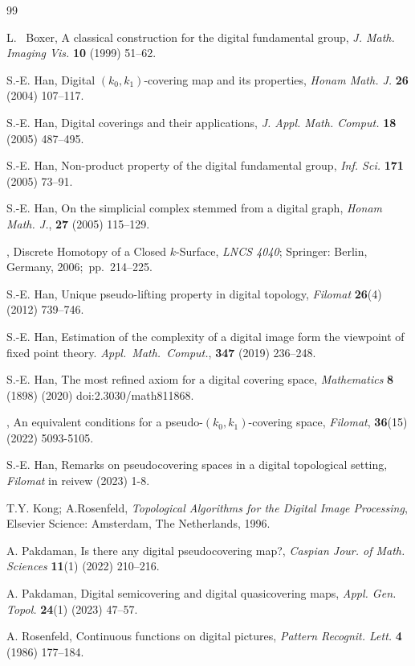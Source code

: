 \documentclass[J,12pt]{amsart}
\begin{document}
\begin{thebibliography}{99}	
		
	 {L.~ Boxer}, {A classical construction for the digital fundamental group},
	{\em J. Math. Imaging Vis.} {\bf 10} (1999) 51--62.
		
	 {S.-E. Han}, {Digital $(k_0, k_1)$-covering map and its properties},
	{\em Honam Math. J.} {\bf 26} (2004) 107--117.
	
	 {S.-E. Han}, {Digital coverings and their applications}, {\em  J. Appl. Math. Comput.} {\bf 18} (2005) 487--495.
	
	 {S.-E. Han}, {Non-product property of the digital fundamental group}, {\em Inf. Sci.} {\bf 171} (2005) 73--91.
	
	 {S.-E. Han}, {On the simplicial complex stemmed from a digital graph},
	{\em Honam Math. J.}, {\bf 27} (2005) 115--129.
	
	, {Discrete Homotopy of a Closed $k$-Surface}, {\em LNCS 4040};
	Springer: Berlin, Germany, 2006;~pp.~214--225.
	
	 {S.-E. Han}, {Unique pseudo-lifting property in digital topology}, {\em Filomat} {\bf 26}(4) (2012) 739--746.
	
	 {S.-E. Han}, {Estimation of the complexity of a digital image form the viewpoint of fixed point theory}.
	{\em Appl.~Math.~Comput.}, {\bf 347} (2019) 236--248.
	
	 {S.-E. Han}, {The most refined axiom for a digital covering space}, {\em Mathematics} {\bf 8} (1898) (2020) doi:2.3030/math811868.	
	
	
	, {An equivalent conditions for a pseudo-$(k_0,k_1)$-covering space}, {\em Filomat}, {\bf 36}(15) (2022) 5093-5105.
	
		 {S.-E. Han}, {Remarks on pseudocovering spaces in a digital topological setting}, {\em Filomat} in reivew (2023) 1-8.
	
		
		 {T.Y. Kong; A.Rosenfeld}, {\em Topological Algorithms for the Digital Image Processing}, Elsevier Science: Amsterdam, The Netherlands, 1996.
		
		
		 {A. Pakdaman}, {Is there any digital pseudocovering map?}, {\em Caspian Jour. of Math. Sciences} {\bf 11}(1) (2022) 210--216.
		
		 {A. Pakdaman}, {Digital semicovering and digital quasicovering maps}, {\em Appl. Gen. Topol.} {\bf 24}(1) (2023) 47--57.
					
		
		 {A. Rosenfeld}, {Continuous functions on digital pictures}, {\em Pattern Recognit. Lett.} {\bf 4} (1986) 177--184.
		
		
\end{thebibliography}
\end{document}

